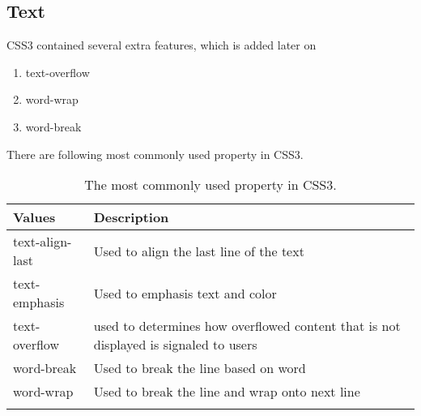 \documentclass[a4paper,oneside]{book}
\numberwithin{equation}{chapter}
\begin{document}
\subsection{Text}
CSS3 contained several extra features, which is added later on
\begin{enumerate}
\item text-overflow
\item word-wrap
\item word-break
\end{enumerate}
There are following most commonly used property in CSS3.
\begin{center}
\begin{longtable}{|l|p{7cm}|}
\hline
\textbf{Values} & \textbf{Description}\\
\hline
text-align-last & Used to align the last line of the text\\
\hline
text-emphasis & Used to emphasis text and color\\
\hline
text-overflow & used to determines how overflowed content that is not displayed is signaled to users\\
\hline
word-break & Used to break the line based on word\\
\hline
word-wrap & Used to break the line and wrap onto next line\\
\hline
\caption{The most commonly used property in CSS3.}
\end{longtable}
\end{center}
\end{document}
